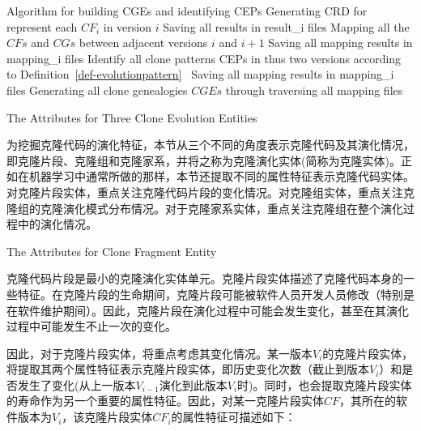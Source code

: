 \vspace{1em}
\begin{minipage}{0.8\textwidth}
\centering
\begin{algorithm}[H]
{Algorithm for building CGEs and identifying CEPs}
\label{alg-building}
{ 
 Generating CRD for represent each $CF_i$ in version $i$\;
 Saving all results in {result\_i} files\;
}
{ 
 Mapping all the $CFs$ and $CGs$ between adjacent versions {$i$} and {$i+1$}\;
 Saving all mapping results in {mapping\_i} files\;
}
{
	{
	Identify all clone patterns {CEPs} in thus two versions according to Definition~\ref{def-evolutionpattern}~\;
	Saving all mapping results in {mapping\_i} files\;
	}
}
Generating all clone genealogies $CGEs$ through traversing all mapping files\;
\end{algorithm}
\end{minipage}
\vspace{1em}

{The Attributes for Three Clone Evolution Entities}

为挖掘克隆代码的演化特征，本节从三个不同的角度表示克隆代码及其演化情况，即克隆片段、克隆组和克隆家系，并将之称为克隆演化实体(简称为克隆实体)。正如在机器学习中通常所做的那样，本节还提取不同的属性特征表示克隆代码实体。对克隆片段实体，重点关注克隆代码片段的变化情况。对克隆组实体，重点关注克隆组的克隆演化模式分布情况。对于克隆家系实体，重点关注克隆组在整个演化过程中的演化情况。

{The Attributes for Clone Fragment Entity}

克隆代码片段是最小的克隆演化实体单元。克隆片段实体描述了克隆代码本身的一些特征。在克隆片段的生命期间，克隆片段可能被软件人员开发人员修改（特别是在软件维护期间）。因此，克隆片段在演化过程中可能会发生变化，甚至在其演化过程中可能发生不止一次的变化。

因此，对于克隆片段实体，将重点考虑其变化情况。某一版本$V_i$的克隆片段实体，将提取其两个属性特征表示克隆片段实体，即历史变化次数（截止到版本$V_i$）和是否发生了变化(从上一版本$V_{i-1}$演化到此版本$V_i$时)。同时，也会提取克隆片段实体的寿命作为另一个重要的属性特征。因此，对某一克隆片段实体$CF$，其所在的软件版本为$V_i$，该克隆片段实体$CF_i$的属性特征可描述如下：

